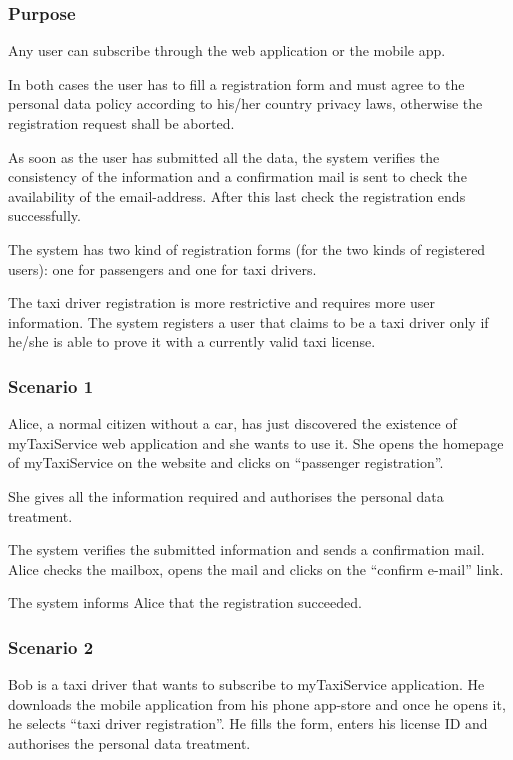 \label{user-registration}
\subsubsection{Purpose}
Any user can subscribe through the web application or the mobile app.

In both cases the user has to fill a registration form and must agree to the personal data policy according to his/her country privacy laws, otherwise the registration request shall be aborted.

As soon as the user has submitted all the data, the system verifies the consistency of the information and a confirmation mail is sent to check the availability of the email-address.  After this last check the registration ends successfully.

The system has two kind of registration forms (for the two kinds of registered users): one for passengers and one for taxi drivers.

The taxi driver registration is more restrictive and requires more user information.
The system registers a user that claims to be a taxi driver only if he/she is able to prove it with a currently valid taxi license.


\subsubsection{Scenario 1}
Alice, a normal citizen without a car, has just discovered the existence of myTaxiService web application and she wants to use it.
She opens the homepage of myTaxiService on the website and clicks on ``passenger registration''.

She gives all the information required and authorises the personal data treatment.

The system verifies the submitted information and sends a confirmation mail.
Alice checks the mailbox, opens the mail and clicks on the ``confirm e-mail'' link.

The system informs Alice that the registration succeeded.

\subsubsection{Scenario 2}
Bob is a taxi driver that wants to subscribe to myTaxiService application.
He downloads the mobile application from his phone app-store and once he opens it, he selects ``taxi driver registration''.
He fills the form, enters his license ID and authorises the personal data treatment.

